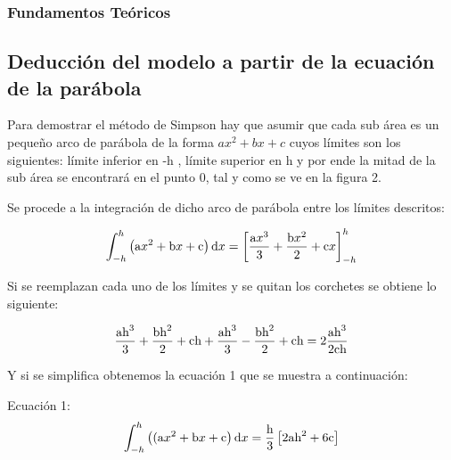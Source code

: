 \documentclass{beamer}
\begin{document}
\begin{frame}
\frametitle{Fundamentos Teóricos}
\subsection{Deducción del modelo a partir de la ecuación de la parábola}
Para demostrar el método de Simpson hay que asumir que cada sub área es un pequeño arco de parábola de la forma $ ax^2 + bx + c $ cuyos límites son los siguientes: límite inferior en -h , límite superior en h y por ende la mitad de la sub área se encontrará en el punto 0, tal y como se ve en la figura 2.
	
	
		Se procede a la integración de dicho arco de parábola entre los límites descritos:
		
		\[ \int_{-h}^{h}\left(\textup{a}x^2 + \textup{b}x + \textup{c}\right)\textup{d}x=\left[\frac{\textup{a}x^{3}}
		{3}+\frac{\textup{b}x^{2}}{2}+\textup{c}x\right]_{-h}^{h} \] 
		
		Si se reemplazan cada uno de los límites y se quitan los corchetes se obtiene lo siguiente:
		
		\[\frac{\textup{a}\textup{h}^3}{3} + \frac{\textup{b}\textup{h}^2}{2} + \textup{c}\textup{h} + \frac{\textup{a}\textup{h}^3}{3} 
		-  \frac{\textup{b}\textup{h}^2}{2} + \textup{c}\textup{h}=2\frac{\textup{a}\textup{h}^3}{2\textup{c}\textup{h}}\]
		
		Y si se simplifica obtenemos la ecuación 1 que se muestra a continuación:
		
		Ecuación 1: \[\int_{-h}^{h}\left((\textup{a}x^2 + \textup{b}x + \textup{c}\right)\textup{d}x=\frac{\textup{h}}
		{3}\left[2\textup{a}\textup{h}^2  +  6\textup{c}\right]\]
		
	
\end{frame}
\end{document}

